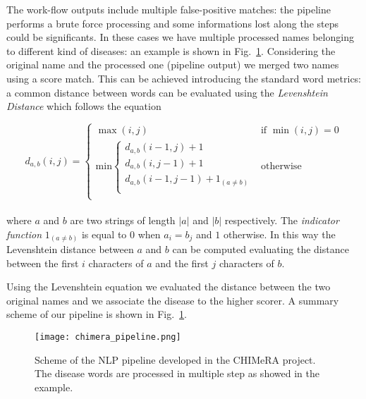 \documentclass{standalone}
\begin{document}
The work-flow outputs include multiple false-positive matches: the pipeline performs a brute force processing and some informations lost along the steps could be significants.
In these cases we have multiple processed names belonging to different kind of diseases: an example is shown in Fig.~\ref{fig:chimera_pipe}.
Considering the original name and the processed one (pipeline output) we merged two names using a score match.
This can be achieved introducing the standard word metrics: a common distance between words can be evaluated using the \emph{Levenshtein Distance} which follows the equation

$$
d_{a, b}(i, j) = \left\{ \begin{array}{rc}
  \max(i, j)                                                       & \mbox{if   } \min(i, j) = 0 \\
  \mbox{min} \left\{ \begin{array}{r}
      d_{a, b}(i - 1, j) + 1                     \\
      d_{a, b}(i, j - 1) + 1                     \\
      d_{a, b}(i - 1, j - 1) + 1_{(a \neq b)}    \\
    \end{array}
    \right.                                                        & \mbox{otherwise}            \\

  \end{array}
  \right.
$$
\\
where $a$ and $b$ are two strings of length $|a|$ and $|b|$ respectively.
The \emph{indicator function} $1_{(a \neq b)}$ is equal to $0$ when $a_i = b_j$ and $1$ otherwise.
In this way the Levenshtein distance between $a$ and $b$ can be computed evaluating the distance between the first $i$ characters of $a$ and the first $j$ characters of $b$.

Using the Levenshtein equation we evaluated the distance between the two original names and we associate the disease to the higher scorer.
A summary scheme of our pipeline is shown in Fig.~\ref{fig:chimera_pipe}.

\begin{figure}[htbp]
\centering
\texttt{[image: chimera\_pipeline.png]}
\caption{Scheme of the NLP pipeline developed in the CHIMeRA project.
The disease words are processed in multiple step as showed in the example.
}
\label{fig:chimera_pipe}
\end{figure}
\end{document}
